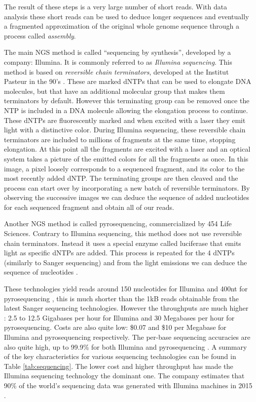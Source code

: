 \documentclass[
  11pt,
  twoside,
  BCOR=10mm,
  listof=totoc]{scrbook}
\begin{document}
The result of these steps is a very large number of short reads. With data analysis these short reads can be used to deduce longer sequences and eventually a fragmented approximation of the original whole genome sequence through a process called \emph{assembly}.

The main NGS method is called ``sequencing by synthesis'', developed by a company: Illumina. It is commonly referred to as \emph{Illumina sequencing}. This method is based on \emph{reversible chain terminators}, developed at the Institut Pasteur in the 90's \autocite{canardDNAPolymeraseFluorescent1994}. These are marked dNTPs that can be used to elongate DNA molecules, but that have an additional molecular group that makes them terminators by default. However this terminating group can be removed once the NTP is included in a DNA molecule allowing the elongation process to continue. These dNTPs are fluorescently marked and when excited with a laser they emit light with a distinctive color. During Illumina sequencing, these reversible chain terminators are included to millions of fragments at the same time, stopping elongation. At this point all the fragments are excited with a laser and an optical system takes a picture of the emitted colors for all the fragments as once. In this image, a pixel loosely corresponds to a sequenced fragment, and its color to the most recently added dNTP. The terminating groups are then cleaved and the process can start over by incorporating a new batch of reversible terminators. By observing the successive images we can deduce the sequence of added nucleotides for each sequenced fragment and obtain all of our reads.

Another NGS method is called pyrosequencing, commercialized by 454 Life Sciences. Contrary to Illumina sequencing, this method does not use reversible chain terminators. Instead it uses a special enzyme called luciferase that emits light as specific dNTPs are added. This process is repeated for the 4 dNTPs (similarly to Sanger sequencing) and from the light emissions we can deduce the sequence of nucleotides \autocite{nyrenSolidPhaseDNA1993}.

These technologies yield reads around 150 nucleotides for Illumina and 400nt for pyrosequencing \autocite{mardisDecadePerspectiveDNA2011}, this is much shorter than the 1kB reads obtainable from the latest Sanger sequencing technologies. However the throughputs are much higher \autocite{liuComparisonNextGenerationSequencing2012}: 2.5 to 12.5 Gigabases per hour for Illumina and 30 Megabases per hour for pyrosequencing. Costs are also quite low: \$0.07 and \$10 per Megabase for Illumina and pyrosequencing respectively. The per-base sequencing accuracies are also quite high, up to 99.9\% for both Illumina \autocite{stolerSequencingErrorProfiles2021} and pyrosequencing \autocite{liuComparisonNextGenerationSequencing2012}. A summary of the key characteristics for various sequencing technologies can be found in Table \ref{tab:sequencing}. The lower cost and higher throughput has made the Illumina sequencing technology the dominant one. The company estimates that 90\% of the world's sequencing data was generated with Illumina machines in 2015 \autocite{SequencingTechnologySequencing}.
\end{document}
